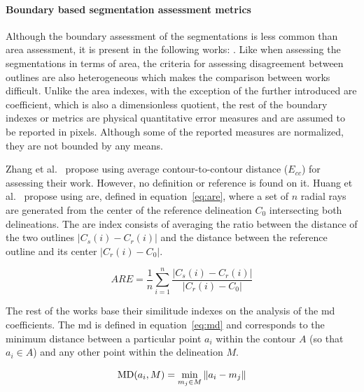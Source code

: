 \paragraph{Boundary based segmentation assessment metrics}

Although the boundary assessment of the segmentations is less common than area assessment, it is present in the following works: \cite{AlemanFlores:2007p14310,Gomez:2010p14339,Gao:2012p14336,Madabhushi:2003p6036,
Shan:2012p14347,Zhang:2010p14317,Huang:2012p14313}. Like when assessing the segmentations in terms of area, the criteria for assessing disagreement between outlines are also heterogeneous which makes the comparison between works difficult. 
Unlike the area indexes, with the exception of the further introduced \ac{are} coefficient, which is also a dimensionless quotient, the rest of the boundary indexes or metrics are physical quantitative error measures and are assumed to be reported in pixels. Although some of the reported measures are normalized, they are not bounded by any means.

Zhang et al.~\cite{Zhang:2010p14317} propose using average contour-to-contour distance ($E_{cc}$) for assessing their work. However, no definition or reference is found on it. Huang et al.~\cite{Huang:2012p14313} propose using \ac{are}, defined in equation~\ref{eq:are}, where a set of $n$ radial rays are generated from the center of the reference delineation $C_0$ intersecting both delineations. The \ac{are} index consists of averaging the ratio between the distance of the two outlines $|C_s(i)-C_r(i)|$ and the distance between the reference outline and its center $|C_r(i)-C_0|$.

\begin{equation}\label{eq:are}
ARE = \frac{1}{n}\sum_{i=1}^{n} \frac{|C_s(i)-C_r(i)|}{|C_r(i)-C_0|}
\end{equation}

The rest of the works base their similitude indexes on the analysis of the \ac{md} coefficients. The \ac{md} is defined in equation~\ref{eq:md} and corresponds to the minimum distance between a particular point $a_i$ within the contour $A$ (so that $a_i \in A$) and any other point within the delineation $M$. 

\begin{equation}
\text{MD}(a_i,M) =\min_{m_j \in M}\Arrowvert a_i - m_j \Arrowvert 
\label{eq:md}
\end{equation}


